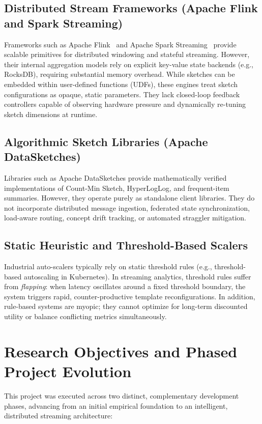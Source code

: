\subsection{Distributed Stream Frameworks (Apache Flink and Spark Streaming)}
Frameworks such as Apache Flink~\cite{carbone2015apache} and Apache Spark Streaming~\cite{zaharia2013discretized} provide scalable primitives for distributed windowing and stateful streaming. However, their internal aggregation models rely on explicit key-value state backends (e.g., RocksDB), requiring substantial memory overhead. While sketches can be embedded within user-defined functions (UDFs), these engines treat sketch configurations as opaque, static parameters. They lack closed-loop feedback controllers capable of observing hardware pressure and dynamically re-tuning sketch dimensions at runtime.

\subsection{Algorithmic Sketch Libraries (Apache DataSketches)}
Libraries such as Apache DataSketches provide mathematically verified implementations of Count-Min Sketch, HyperLogLog, and frequent-item summaries. However, they operate purely as standalone client libraries. They do not incorporate distributed message ingestion, federated state synchronization, load-aware routing, concept drift tracking, or automated straggler mitigation.

\subsection{Static Heuristic and Threshold-Based Scalers}
Industrial auto-scalers typically rely on static threshold rules (e.g., threshold-based autoscaling in Kubernetes). In streaming analytics, threshold rules suffer from \textit{flapping}: when latency oscillates around a fixed threshold boundary, the system triggers rapid, counter-productive template reconfigurations. In addition, rule-based systems are myopic; they cannot optimize for long-term discounted utility or balance conflicting metrics simultaneously.

\section{Research Objectives and Phased Project Evolution}

This project was executed across two distinct, complementary development phases, advancing from an initial empirical foundation to an intelligent, distributed streaming architecture:

